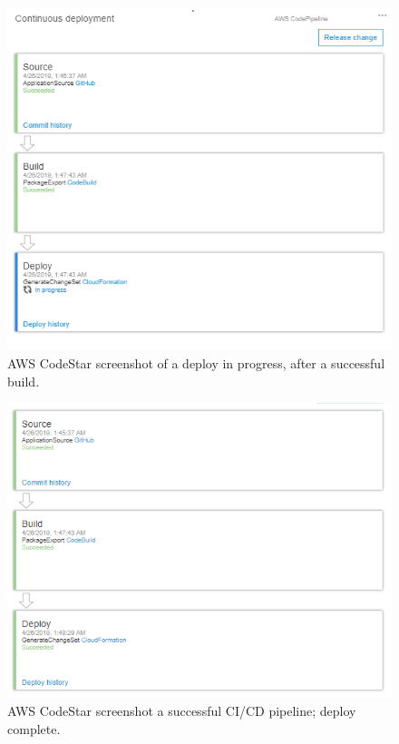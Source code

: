 \documentclass[10pt, a4paper]{article}
\begin{document}
\begin{figure}[H]
\begin{center}
  \includegraphics[scale=1]{deploy-in-progress.PNG}
  \caption{AWS CodeStar screenshot of a deploy in progress, after a successful build.}
\end{center}
\end{figure}

\begin{figure}[H]
\begin{center}
  \includegraphics[scale=1]{successful-deploy.PNG}
  \caption{AWS CodeStar screenshot a successful CI/CD pipeline; deploy complete.}
\end{center}
\end{figure}
\end{document}
